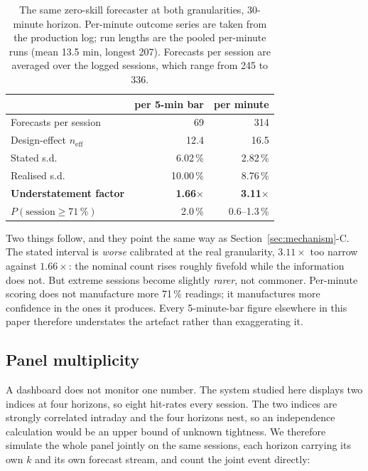 \documentclass[conference]{IEEEtran}
\begin{document}
\begin{table}[!tb]
\caption{The same zero-skill forecaster at both granularities, 30-minute
horizon. Per-minute outcome series are taken from the production log; run
lengths are the pooled per-minute runs (mean 13.5 min, longest 207). Forecasts
per session are averaged over the logged sessions, which range from 245 to 336.}
\label{tab:perminute}
\centering
\footnotesize
\setlength{\tabcolsep}{4pt}
\begin{tabular}{@{}lrr@{}}
\toprule
& \textbf{per 5-min bar} & \textbf{per minute} \\
\midrule
Forecasts per session & 69 & 314 \\
Design-effect $n_{\text{eff}}$ & 12.4 & 16.5 \\
Stated s.d. & 6.02\,\% & 2.82\,\% \\
Realised s.d. & 10.00\,\% & 8.76\,\% \\
\textbf{Understatement factor} & \textbf{1.66$\times$} & \textbf{3.11$\times$} \\
$P(\text{session} \geq 71\,\%)$ & 2.0\,\% & 0.6--1.3\,\% \\
\bottomrule
\end{tabular}
\end{table}

Two things follow, and they point the same way as
Section~\ref{sec:mechanism}-C. The stated interval is \emph{worse} calibrated at
the real granularity, $3.11\times$ too narrow against $1.66\times$: the nominal
count rises roughly fivefold while the information does not. But extreme
sessions become slightly \emph{rarer}, not commoner. Per-minute scoring does not
manufacture more 71\,\% readings; it manufactures more confidence in the ones it
produces. Every 5-minute-bar figure elsewhere in this paper therefore understates
the artefact rather than exaggerating it.

\subsection{Panel multiplicity}

A dashboard does not monitor one number. The system studied here displays two
indices at four horizons, so eight hit-rates every session. The two indices are
strongly correlated intraday and the four horizons nest, so an independence
calculation would be an upper bound of unknown tightness. We therefore simulate
the whole panel jointly on the same sessions, each horizon carrying its own $k$
and its own forecast stream, and count the joint event directly:
\end{document}

